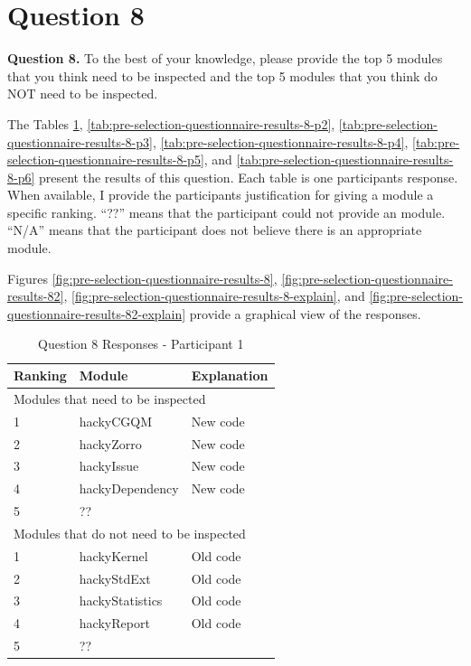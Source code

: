 \clearpage
\section{Question 8}
\label{appendix:section:question8}
\noindent \textbf{Question 8.} To the best of your knowledge, please
provide the top 5 modules that you think need to be inspected and the top 5 
modules that you think do NOT need to be inspected.

The Tables \ref{tab:pre-selection-questionnaire-results-8-p1},
\ref{tab:pre-selection-questionnaire-results-8-p2},
\ref{tab:pre-selection-questionnaire-results-8-p3},
\ref{tab:pre-selection-questionnaire-results-8-p4},
\ref{tab:pre-selection-questionnaire-results-8-p5}, and
\ref{tab:pre-selection-questionnaire-results-8-p6} present the results of
this question. Each table is one participants response. When available, I
provide the participants justification for giving a module a specific
ranking. ``??''  means that the participant could not provide an module.
``N/A'' means that the participant does not believe there is an appropriate
module.

Figures \ref{fig:pre-selection-questionnaire-results-8},
\ref{fig:pre-selection-questionnaire-results-82},
\ref{fig:pre-selection-questionnaire-results-8-explain}, and
\ref{fig:pre-selection-questionnaire-results-82-explain} provide a
graphical view of the responses.


\begin{table}[!h]
  \begin{center}
    \caption{Question 8 Responses - Participant 1}
    \label{tab:pre-selection-questionnaire-results-8-p1}
    \begin{tabular}{|p{2.0cm}|p{4.0cm}|p{7.0cm}|} \hline
{\bf Ranking} & {\bf Module} & {\bf Explanation} \\ \hline
\multicolumn{3}{|p{13.0cm}|}{Modules that need to be inspected} \\ \hline
1 & hackyCGQM & New code \\ \hline
2 & hackyZorro & New code \\ \hline
3 & hackyIssue & New code \\ \hline
4 & hackyDependency & New code \\ \hline
5 & ?? & \\ \hline
\multicolumn{3}{|p{13.0cm}|}{Modules that do not need to be inspected} \\ \hline
1 & hackyKernel & Old code \\ \hline
2 & hackyStdExt & Old code \\ \hline
3 & hackyStatistics & Old code \\ \hline
4 & hackyReport & Old code \\ \hline
5 & ?? & \\ \hline
    \end{tabular}
  \end{center}
\end{table}


